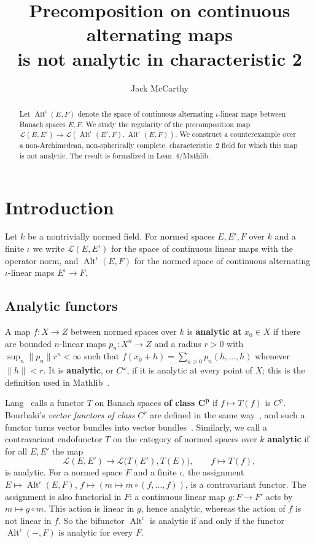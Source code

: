 \documentclass[11pt]{amsart}
\title[Alternating precomposition is not analytic in characteristic 2]{Precomposition on continuous alternating maps\\ is not analytic in characteristic 2}
\author{Jack McCarthy}
\theoremstyle{remark}
\newcommand{\kk}{k}
\newcommand{\cL}{\mathcal{L}}
\newcommand{\Alt}{\operatorname{Alt}}
\newcommand{\norm}[1]{\lVert #1\rVert}
\newcommand{\1}{\mathbf{1}}
\begin{document}
\begin{abstract}
Let $\Alt^\iota(E,F)$ denote the space of continuous alternating $\iota$-linear maps between Banach spaces $E,F$. We study the
regularity of the precomposition map $\cL(E,E')\to\cL(\Alt^\iota(E',F),\Alt^\iota(E,F))$. We construct a counterexample over a
non-Archimedean, non-spherically complete, characteristic~$2$ field for which this map is not analytic. The result is
formalized in Lean~4/Mathlib.
\end{abstract}
\maketitle

\section{Introduction}
Let $\kk$ be a nontrivially normed field. For normed spaces $E,E',F$ over $\kk$ and a finite $\iota$ we write $\cL(E,E')$
for the space of continuous linear maps with the operator norm, and $\Alt^\iota(E,F)$ for the normed space of continuous
alternating $\iota$-linear maps $E^\iota\to F$.

\subsection*{Analytic functors}
A map $f\colon X\to Z$ between normed spaces over $\kk$ is \textbf{analytic at} $x_0\in X$ if there are bounded $n$-linear maps
$p_n\colon X^n\to Z$ and a radius $r>0$ with $\sup_n\norm{p_n}r^n<\infty$ such that $f(x_0+h)=\sum_{n\ge0}p_n(h,\dots,h)$ whenever
$\norm h<r$. It is \textbf{analytic}, or $C^\omega$, if it is analytic at every point of $X$; this is the definition used in
Mathlib~\cite{docs}.

Lang~\cite[Ch.~III, \S4]{La} calls a functor $T$ on Banach spaces
\textbf{of class $\boldsymbol{C^p}$} if $f\mapsto T(f)$ is $C^p$. Bourbaki's \emph{vector functors of class $C^r$} are defined in the
same way~\cite[n\textsuperscript{o}~7.6.1]{Bou}, and such a functor turns vector bundles into vector
bundles~\cite[n\textsuperscript{o}~7.6.2]{Bou}. Similarly, we call a contravariant endofunctor $T$ on the category of normed spaces over $\kk$
\textbf{analytic} if for all $E,E'$ the map
\[
\cL(E,E')\to\cL\bigl(T(E'),T(E)\bigr),\qquad f\mapsto T(f),
\]
is analytic. For a normed space $F$ and a finite $\iota$, the assignment $E\mapsto\Alt^\iota(E,F)$,
$f\mapsto(m\mapsto m\circ(f,\dots,f))$, is a contravariant functor. The assignment is also functorial in $F$: a continuous linear map $g\colon F\to F'$ acts by $m\mapsto g\circ m$. This
action is linear in $g$, hence analytic, whereas the action of $f$ is not linear in $f$. So the bifunctor $\Alt^\iota$ is
analytic if and only if the functor $\Alt^\iota(-,F)$ is analytic for every $F$.
\end{document}
